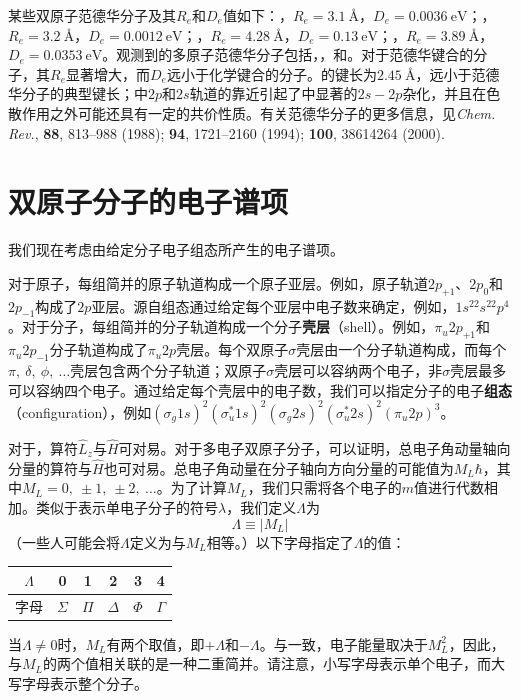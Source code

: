     某些双原子范德华分子及其$R_e$和$D_e$值如下：，$R_e = 3.1\:\mathrm{Å}$，$D_e = 0.0036\:\mathrm{eV}$；，$R_e = 3.2\:\mathrm{Å}$，$D_e = 0.0012\:\mathrm{eV}$；，$R_e = 4.28\:\mathrm{Å}$，$D_e = 0.13\:\mathrm{eV}$；，$R_e = 3.89\:\mathrm{Å}$，$D_e = 0.0353\:\mathrm{eV}$。观测到的多原子范德华分子包括，，和。对于范德华键合的分子，其$R_e$显著增大，而$D_e$远小于化学键合的分子。的键长为$2.45\:\mathrm{Å}$，远小于范德华分子的典型键长；中$2p$和$2s$轨道的靠近引起了中显著的$2s-2p$杂化，并且在色散作用之外可能还具有一定的共价性质。有关范德华分子的更多信息，见\textit{Chem. Rev.}, \textbf{88}, 813–988 (1988); \textbf{94}, 1721–2160 (1994); \textbf{100}, 38614264 (2000).

\section{双原子分子的电子谱项}
\label{sec:13.8 Electronic Terms of Diatomic Molecules}

    我们现在考虑由给定分子电子组态所产生的电子谱项。

    对于原子，每组简并的原子轨道构成一个原子亚层。例如，原子轨道$2p_{+1}$、$2p_0$和$2p_{-1}$构成了$2p$亚层。源自组态通过给定每个亚层中电子数来确定，例如，$1s^22s^22p^4$。对于分子，每组简并的分子轨道构成一个分子\textbf{壳层}（shell）。例如，$\pi_u2p_{+1}$和$\pi_u2p_{-1}$分子轨道构成了$\pi_u2p$壳层。每个双原子$\sigma$壳层由一个分子轨道构成，而每个$\pi,\:\delta,\:\phi,\:\ldots$壳层包含两个分子轨道；双原子$\sigma$壳层可以容纳两个电子，非$\sigma$壳层最多可以容纳四个电子。通过给定每个壳层中的电子数，我们可以指定分子的电子\textbf{组态}（configuration），例如$\left(\sigma_{g} 1s\right)^{2}\left(\sigma_{u}^{*} 1s\right)^{2}\left(\sigma_{g} 2s\right)^{2}\left(\sigma_{u}^{*} 2s\right)^{2}\left(\pi_{u} 2p\right)^{3}$。

    对于，算符$\hat{L}_z$与$\hat{H}$可对易。对于多电子双原子分子，可以证明，总电子角动量轴向分量的算符与$\hat{H}$也可对易。总电子角动量在分子轴向方向分量的可能值为$M_L\hbar$，其中$M_L = 0,\:\pm 1,\:\pm 2,\:\ldots$。为了计算$M_L$，我们只需将各个电子的$m$值进行代数相加。类似于表示单电子分子的符号$\lambda$，我们定义$\Lambda$为
    \begin{equation}
        \Lambda \equiv \left| M_L \right|
        \label{eq:13.84}
    \end{equation}
    （一些人可能会将$\Lambda$定义为与$M_L$相等。）以下字母指定了$\Lambda$的值：
    \begin{table}
        \centering
        \begin{tabular}{c|c|c|c|c|c}
            $\Lambda$ & 0 & 1 & 2 & 3 & 4 \\
            \hline
            字母 & $\Sigma$ & $\Pi$ & $\Delta$ & $\Phi$ & $\Gamma$
        \end{tabular}
    \end{table}
    当$\Lambda \neq 0$时，$M_L$有两个取值，即$+\Lambda$和$-\Lambda$。与一致，电子能量取决于$M_L^2$，因此，与$M_L$的两个值相关联的是一种二重简并。请注意，小写字母表示单个电子，而大写字母表示整个分子。

